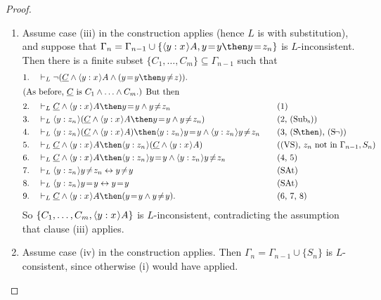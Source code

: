 \documentclass[11pt]{woarticle}
\theoremstyle{break}
\theoremstyle{nonumberplain}
\newcommand{\1}{\;\,|\;\,}
\renewcommand{\t}[1]{\ensuremath{\langle #1  \makebox[.2ex]{}\rangle}}
\renewcommand{\vec}[1]{\ensuremath{\underline{#1}}}
\newcommand{\T}[1]{\ensuremath{(\mathrm{ #1})}}
\begin{document}
\begin{proof}
\begin{enumerate}
\begin{enumerate}
    \item Assume case (iii) in the construction applies (hence $L$ is
      with substitution), and suppose that $\Gamma_n = \Gamma_{n-1}
      \cup \{ \t{y:x}A, y\!=\!y \then y\!=\!z_n \}$ is
      $L$-inconsistent. Then there is a finite subset $\{
      C_1,\ldots,C_m \} \subseteq \Gamma_{n-1}$ such that
      \begin{alignat*}{2}
        1.\quad& \vdash_{L} \neg (\vec{C} \land
        \t{y:x} A \land (y\!=\!y \then y\!\not=\!z)). &\quad&\\
      \intertext{(As before, $\vec{C}$ is $C_1\land\ldots\land C_m$.) But then}
        2.\quad& \vdash_{L} \vec{C}
        \land \t{y:x}A \then y\!=\!y \land y\!\not=\!z_n
        && \text{(1)}\\
        3.\quad& \vdash_{L} \t{y:z_n} (\vec{C}
        \land \t{y:x}A \then y\!=\!y \land y\!\not=\!z_n)
        && \text{(2, \T{Sub_s})}\\
        4.\quad& \vdash_{L} \t{y:z_n} (\vec{C}
        \land \t{y:x}A) \then \t{y:z_n} y\!=\!y \land \t{y:z_n}y\!\not=\!z_n
        && \text{(3, \T{S\!\then}, \T{S\!\neg})}\\
        5.\quad& \vdash_{L} \vec{C} \land \t{y:x}A \then \t{y:z_n} (\vec{C}
        \land \t{y:x}A)
        && \text{(\T{VS}, $z_n$ not in $\Gamma_{n-1}, S_n$)}\\
        6.\quad& \vdash_{L} \vec{C}
        \land \t{y:x}A \then \t{y:z_n} y\!=\!y \land \t{y:z_n}y\!\not=\!z_n
        && \text{(4, 5)}\\
        7.\quad& \vdash_{L} \t{y:z_n} y\!\not=\!z_n \leftrightarrow y\!\not=\!y
        && \text{\T{SAt}}\\
        8.\quad& \vdash_{L} \t{y:z_n} y\!=\!y \leftrightarrow y\!=\!y
        && \text{\T{SAt}}\\
        9.\quad& \vdash_{L} \vec{C} \land \t{y:x}A 
        \then (y\!=\!y \land y\!\not=\!y).
        && \text{(6, 7, 8)}
      \end{alignat*}
      So $\{C_1,\ldots,C_m, \t{y:x}A\}$ is $L$-inconsistent,
      contradicting the assumption that clause (iii) applies.

    \item Assume case (iv) in the construction applies. Then $\Gamma_n
      = \Gamma_{n-1} \cup \{ S_n \}$ is $L$-consistent, since
      otherwise  (i) would have applied.

    \end{enumerate}


\end{enumerate}
\end{proof}
\end{document}
